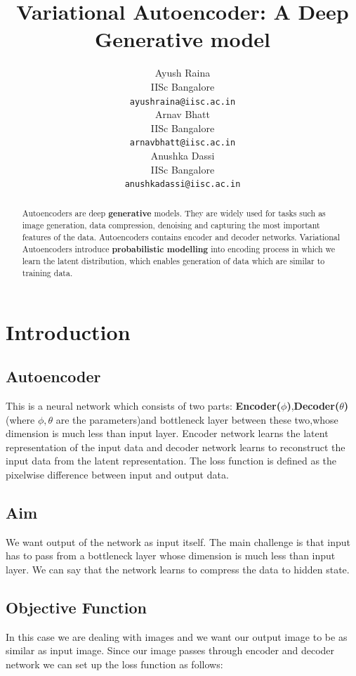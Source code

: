 \documentclass[10pt,a4paper]{article}
\title{Variational Autoencoder: A Deep Generative model}
\author{
  Ayush Raina \\
  IISc Bangalore \\
  \texttt{ayushraina@iisc.ac.in} \\
  \And
  Arnav Bhatt \\
  IISc Bangalore \\
  \texttt{arnavbhatt@iisc.ac.in} \\
  \AND
  Anushka Dassi \\
  IISc Bangalore \\
  \texttt{anushkadassi@iisc.ac.in} \\
}
\begin{document}
\maketitle


\begin{abstract}
  Autoencoders are deep \textbf{generative} models. They are widely used for tasks such as image generation, data compression, denoising and capturing the most important features of the data. Autoencoders contains encoder and decoder networks. Variational Autoencoders introduce \textbf{probabilistic modelling} into encoding process in which we learn the latent distribution, which enables generation of data which are similar to training data.
\end{abstract}


\section{Introduction}

\subsection{Autoencoder}
This is a neural network which consists of two parts: \textbf{Encoder($\phi$)},\textbf{Decoder($\theta$)} (where $\phi, \theta$ are the parameters)and bottleneck layer between these two,whose dimension is much less than input layer. Encoder network learns the latent representation of the input data and decoder network learns to reconstruct the input data from the latent representation. The loss function is defined as the pixelwise difference between input and output data.

\subsection{Aim}
We want output of the network as input itself. The main challenge is that input has to pass from a bottleneck layer whose dimension is much less than input layer. We can say that the network learns to compress the data to hidden state.

\subsection{Objective Function}
In this case we are dealing with images and we want our output image to be as similar as input image. Since our image passes through encoder and decoder network we can set up the loss function as follows:
\end{document}
